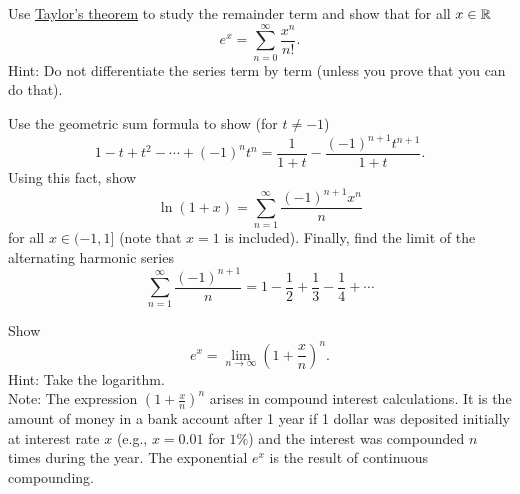 \begin{exercise}
Use \hyperref[thm:taylor]{Taylor's theorem} to study the remainder term and show that for
all $x \in {\mathbb{R}}$
\begin{equation*}
e^x = \sum_{n=0}^\infty \frac{x^n}{n!} .
\end{equation*}
Hint: Do not differentiate the series term by term (unless you prove that
you can do that).
\end{exercise}

\begin{exercise}
Use the geometric sum formula to show (for $t \neq -1$)
\begin{equation*}
1-t+t^2-\cdots+{(-1)}^n t^n = \frac{1}{1+t} - \frac{{(-1)}^{n+1}t^{n+1}}{1+t}.
\end{equation*}
Using this fact, show
\begin{equation*}
\ln (1+x) = \sum_{n=1}^\infty \frac{{(-1)}^{n+1}x^n}{n} 
\end{equation*}
for all $x \in (-1,1]$ (note that $x=1$ is included).  Finally,
find the limit of the alternating harmonic series
\begin{equation*}
\sum_{n=1}^\infty \frac{{(-1)}^{n+1}}{n} = 1 - \frac{1}{2} +
\frac{1}{3} - \frac{1}{4} + \cdots
\end{equation*}
\end{exercise}

\begin{exercise}
Show 
\begin{equation*}
e^x = \lim_{n\to\infty} {\left( 1 + \frac{x}{n} \right)}^n .
\end{equation*}
Hint: Take the logarithm.\\
Note: The expression 
${\left( 1 + \frac{x}{n} \right)}^n$ arises in compound interest
calculations.  It is the amount of money in a bank account after 1 year
if 1 dollar was deposited initially at interest rate $x$ (e.g., $x=0.01$ for
$1\%$) and the interest was compounded $n$
times during the year.  The exponential $e^x$ is the result of continuous
compounding.
\end{exercise}


